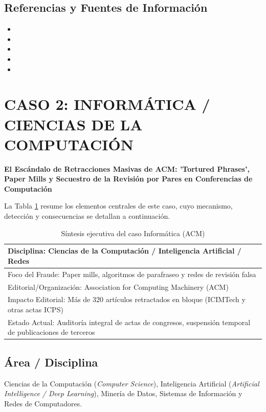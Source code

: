 \documentclass[12pt,a4paper]{article}
\let\oldsection\section
\renewcommand{\section}[1]{\needspace{5\baselineskip}\oldsection{#1}}
\begin{document}
\subsection{Referencias y Fuentes de Información}
\begin{itemize}
\item {}
\item {}
\item {}
\item {}
\item {}
\end{itemize}
\section{CASO 2: INFORMÁTICA / CIENCIAS DE LA COMPUTACIÓN}
\textbf{\textquotedbl{}El Escándalo de Retracciones Masivas de ACM: 'Tortured Phrases', Paper Mills y Secuestro de la Revisión por Pares en Conferencias de Computación\textquotedbl{}}

La Tabla \ref{tab:sintesis-acm} resume los elementos centrales de este caso, cuyo mecanismo, detección y consecuencias se detallan a continuación.
\begin{table}[htbp]
\centering
\caption{Síntesis ejecutiva del caso Informática (ACM)}
\label{tab:sintesis-acm}
\begin{tabularx}{\linewidth}{X}
\toprule
Disciplina: Ciencias de la Computación / Inteligencia Artificial / Redes \\
\midrule
Foco del Fraude: Paper mills, algoritmos de parafraseo y redes de revisión falsa \\
Editorial/Organización: Association for Computing Machinery (ACM) \\
Impacto Editorial: Más de 320 artículos retractados en bloque (ICIMTech y otras actas ICPS) \\
Estado Actual: Auditoría integral de actas de congresos, suspensión temporal de publicaciones de terceros \\
\bottomrule
\end{tabularx}
\end{table}
\subsection{Área / Disciplina}
Ciencias de la Computación (\textit{Computer Science}), Inteligencia Artificial (\textit{Artificial Intelligence / Deep Learning}), Minería de Datos, Sistemas de Información y Redes de Computadores.
\end{document}
